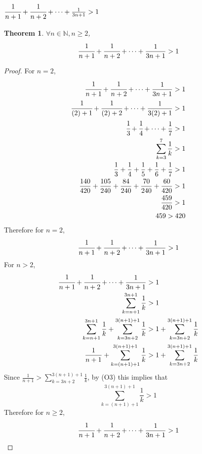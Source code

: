 \documentclass[]{article}
\newcommand{\N}{\mathbb{N}}
\newtheorem{theorem}{Theorem}
\begin{document}
\newpage
\subsection{
    $\cfrac{1}{n+1} + \cfrac{1}{n+2} + \cdots + \frac{1}{3n+1} > 1$
}
\begin{theorem}$\forall n \in \N, n \geq 2$,
    $$\cfrac{1}{n+1} + \cfrac{1}{n+2} + \cdots + \frac{1}{3n+1} > 1$$
\end{theorem}
\begin{proof}
    For $n = 2$,
    \begin{align*}
        \cfrac{1}{n+1} + \cfrac{1}{n+2} + \cdots + \frac{1}{3n+1} > 1\\
        \cfrac{1}{(2)+1} + \cfrac{1}{(2)+2} + \cdots + \frac{1}{3(2)+1} > 1\\
        \cfrac{1}{3} + \cfrac{1}{4} + \cdots + \frac{1}{7} > 1\\
        \sum_{k=3}^{7} \frac{1}{k} > 1\\
        \frac{1}{3} + \frac{1}{4} + \frac{1}{5} + \frac{1}{6} + \frac{1}{7} > 1\\
        \frac{140}{420} + \frac{105}{240} + \frac{84}{240} + \frac{70}{240} + 
            \frac{60}{420} > 1\\
        \frac{459}{420} > 1\\
        459 > 420
    \end{align*}
    Therefore for $n = 2$,
    $$\cfrac{1}{n+1} + \cfrac{1}{n+2} + \cdots + \frac{1}{3n+1} > 1$$
    For $n > 2$,
    \begin{align*}
        \cfrac{1}{n+1} + \cfrac{1}{n+2} + \cdots + \frac{1}{3n+1} &> 1\\
        \sum_{k=n+1}^{3n+1} \frac{1}{k} &> 1\\
        \sum_{k=n+1}^{3n+1} \frac{1}{k} + \sum_{k=3n+2}^{3(n+1) + 1} \frac{1}{k} 
            &> 1 + \sum_{k=3n+2}^{3(n+1) + 1} \frac{1}{k}\\
        \frac{1}{n+1} + \sum_{k=(n+1) + 1}^{3(n+1)+1} \frac{1}{k}
            &> 1 + \sum_{k = 3n+2}^{3(n+1) + 1} \frac{1}{k}\\
    \end{align*}
    Since $\frac{1}{n+1} > \sum_{k = 3n+2}^{3(n+1) + 1} \frac{1}{k}$, 
    by (O3) this implies that 
    $$\sum_{k=(n+1) + 1}^{3(n+1)+1} \frac{1}{k} > 1$$
    Therefore for $n \geq 2$,
    $$ \cfrac{1}{n+1} + \cfrac{1}{n+2} + \cdots + \frac{1}{3n+1} > 1$$
\end{proof}

\newpage
\end{document}

